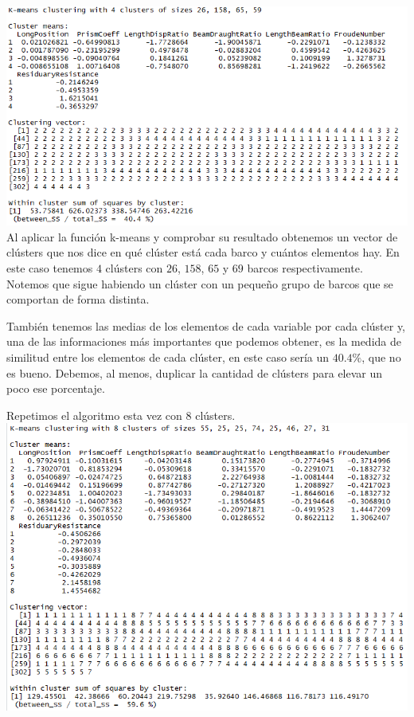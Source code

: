 \documentclass[twoside]{article}
\begin{document}
\begin{multicols}{2}
\includegraphics[scale=0.35]{images/pic_32.png} \\

Al aplicar la funci\'on k-means y comprobar su resultado obtenemos un vector de cl\'usters que nos dice en qu\'e cl\'uster est\'a cada barco y cu\'antos elementos hay. En este caso tenemos $4$ cl\'usters con $26$, $158$, $65$ y $69$ barcos respectivamente. Notemos que sigue habiendo un cl\'uster con un peque\~no grupo de barcos que se comportan de forma distinta.

Tambi\'en tenemos las medias de los elementos de cada variable por cada cl\'uster y, una de las informaciones m\'as importantes que podemos obtener, es la medida de similitud entre los elementos de cada cl\'uster, en este caso ser\'ia un $40.4\%$, que no es bueno. Debemos, al menos, duplicar la cantidad de cl\'usters para elevar un poco ese porcentaje.

Repetimos el algoritmo esta vez con $8$ cl\'usters.\\

\includegraphics[scale=0.35]{images/pic_33.png} \\


\end{multicols}
\end{document}
